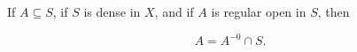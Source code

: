 If $A \subseteq S$, if $S$ is dense in $X$, and if $A$ is regular open in $S$, then

$$A = A^{-0} \cap S.$$
